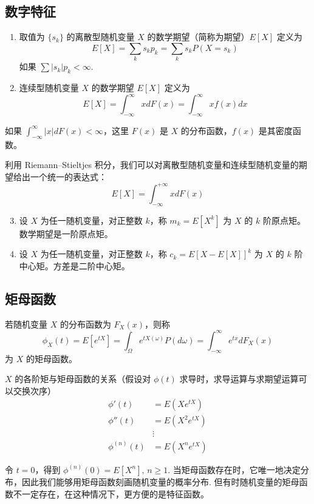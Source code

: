 \documentclass[lang=cn,10pt,thmcnt=section]{elegantbook}
\begin{document}
\subsection{数字特征}
\begin{definition}
	\begin{enumerate}
		\item 取值为 $\{s_k\}$ 的离散型随机变量 $X$ 的数学期望（简称为期望）$E[X]$ 定义为
		\[
		E[X] = \sum_k s_k p_k = \sum_k s_k P(X = s_k)
		\]
		如果 $\sum |s_k| p_k < \infty$.
		\item 连续型随机变量 $X$ 的数学期望 $E[X]$ 定义为
		\[
		E[X] = \int_{-\infty}^{\infty} x dF(x) = \int_{-\infty}^{\infty} x f(x) dx
		\]
	\end{enumerate}
	
	如果 $\int_{-\infty}^{\infty} |x| dF(x) < \infty$，这里 $F(x)$ 是 $X$ 的分布函数，$f(x)$ 是其密度函数。
	
	利用 Riemann–Stieltjes 积分，我们可以对离散型随机变量和连续型随机变量的期望给出一个统一的表达式：
	\[
	E[X] = \int_{-\infty}^{+\infty} x dF(x)
	\]
	
	\begin{enumerate}
		\setcounter{enumi}{2}
		\item 设 $X$ 为任一随机变量，对正整数 $k$，称 $m_k = E[X^k]$ 为 $X$ 的 $k$ 阶原点矩。数学期望是一阶原点矩。
		\item 设 $X$ 为任一随机变量，对正整数 $k$，称 $c_k = E[X - E[X]]^k$ 为 $X$ 的 $k$ 阶中心矩。方差是二阶中心矩。
	\end{enumerate}
\end{definition}

\subsection{矩母函数}
\begin{definition}
	若随机变量 $X$ 的分布函数为 $F_X(x)$，则称
\[
\phi_X(t) = E[e^{tX}] = \int_{\Omega} e^{tX(\omega)} P(d\omega) = \int_{-\infty}^{\infty} e^{tx} dF_X(x)
\]
为 $X$ 的矩母函数。
\end{definition}
\begin{remark}
	
	$X$ 的各阶矩与矩母函数的关系（假设对 $\phi(t)$ 求导时，求导运算与求期望运算可以交换次序）
	\begin{align*}
		\phi'(t) &= E(X e^{tX}) \\
		\phi''(t) &= E(X^2 e^{tX}) \\
		&\vdots \\
		\phi^{(n)}(t) &= E(X^n e^{tX})
	\end{align*}

令 $t = 0$，得到 $\phi^{(n)}(0) = E[X^n], \, n \geq 1$. 当矩母函数存在时，它唯一地决定分布，因此我们能够用矩母函数刻画随机变量的概率分布. 但有时随机变量的矩母函数不一定存在，在这种情况下，更方便的是特征函数。
\end{remark}
\end{document}
